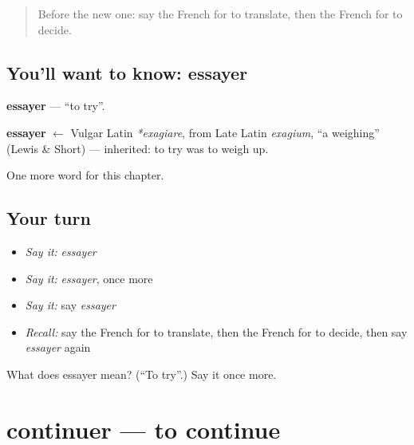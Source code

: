 \label{lesson:FR-C144-essayer}



\begin{quote}
Before the new one: say the French for to translate, then the French for to decide.
\end{quote}

\subsection*{You'll want to know: essayer}
\textbf{essayer} — \textquotedblleft{}to try\textquotedblright{}.

\begin{cousinweb}
\textbf{essayer} $\leftarrow$ Vulgar Latin \emph{*exagiare}, from Late Latin \emph{exagium}, \textquotedblleft{}a weighing\textquotedblright{} (Lewis \& Short) — inherited: to try was to weigh up.
\end{cousinweb}

\begin{grammarlens}[title={What you've built}]
One more word for this chapter.
\end{grammarlens}

\subsection*{Your turn}
\begin{itemize}
\raggedright
  \item \emph{Say it:} \emph{essayer}
  \item \emph{Say it:} \emph{essayer}, once more
  \item \emph{Say it:} say \emph{essayer}
  \item \emph{Recall:} say the French for to translate, then the French for to decide, then say \emph{essayer} again
\end{itemize}

\begin{tcolorbox}[breakable,colback=teal!4,colframe=teal!35!black,title={Before you move on}]
What does essayer mean? (\textquotedblleft{}To try\textquotedblright{}.) Say it once more.
\end{tcolorbox}
\section[continuer]{continuer — to continue}

\label{lesson:FR-C144-continuer}




